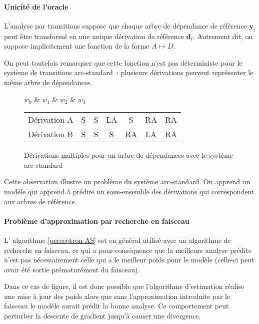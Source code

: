 \documentclass[11pt,openany]{book}
\begin{document}
\paragraph{Unicité de l'oracle}
L'analyse par transitions suppose que chaque arbre de dépendance de
référence $\mathbf{y}_i$ peut être transformé en une unique dérivation de
référence $\mathbf{d}_i$. Autrement dit, on suppose implicitement une fonction de la forme
$A \mapsto D$. 

On peut toutefois remarquer que cette fonction n'est pas déterministe pour le
système de transitions arc-standard~: plusieurs dérivations peuvent
représenter le même arbre de dépendances.

\begin{figure}[htbp]
\begin{center}
\begin{dependency}
\begin{deptext}[column sep=.5cm]
$w_0$ \& $w_1$ \& $w_2$ \& $w_3$\\
\end{deptext}
\end{dependency}

\begin{tabular}{l|cccccc}\toprule
Dérivation A&S&S&LA&S&RA&RA\\
Dérivation B & S&S&S&RA&LA&RA\\\bottomrule
\end{tabular}
\end{center}
\caption{Dérivations multiples pour un arbre de dépendances avec le
  système arc-standard}
\end{figure}

Cette observation illustre un problème du système arc-standard. On
apprend un modèle qui apprend à prédire un sous-ensemble des
dérivations qui correspondent aux arbres de référence.

 \paragraph{Problème d'approximation par recherche en faisceau}
L' algorithme \ref{perceptron-AS} est en général utilisé avec un
algorithme de recherche en faisceau, ce qui a pour conséquence que la
meilleure analyse prédite n'est pas nécessairement celle qui a le meilleur
poids pour le modèle (celle-ci peut avoir été sortie prématurément du faisceau).

Dans ce cas de figure, il est donc possible que l'algorithme
d'estimation réalise une mise à jour des poids alors que sans
l'approximation introduite par le faisceau
le modèle aurait prédit la bonne analyse. Ce comportement peut
perturber la descente de gradient jusqu'à causer une divergence.
\end{document}
